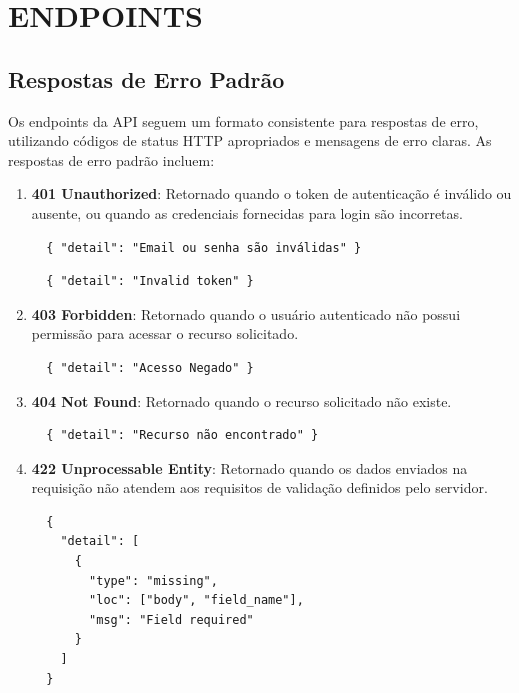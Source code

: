 \chapter{ENDPOINTS}









\section{Respostas de Erro Padrão}

\hspace{0.5cm} Os endpoints da API seguem um formato consistente para respostas de erro, utilizando códigos de status HTTP apropriados e mensagens de erro claras.
As respostas de erro padrão incluem:

\begin{enumerate}
  \item \textbf{401 Unauthorized}: Retornado quando o token de autenticação é inválido ou ausente, ou quando as credenciais fornecidas para login são incorretas.
  \begin{verbatim}
  { "detail": "Email ou senha são inválidas" }
  \end{verbatim}

  \begin{verbatim}
  { "detail": "Invalid token" }
  \end{verbatim}

  \item \textbf{403 Forbidden}: Retornado quando o usuário autenticado não possui permissão para acessar o recurso solicitado.
  \begin{verbatim}
  { "detail": "Acesso Negado" }
  \end{verbatim}

  \item \textbf{404 Not Found}: Retornado quando o recurso solicitado não existe.
  \begin{verbatim}
  { "detail": "Recurso não encontrado" }
  \end{verbatim}

  \item \textbf{422 Unprocessable Entity}: Retornado quando os dados enviados na requisição não atendem aos requisitos de validação definidos pelo servidor.
  \begin{verbatim}
  {
    "detail": [
      {
        "type": "missing",
        "loc": ["body", "field_name"],
        "msg": "Field required"
      }
    ]
  }
  \end{verbatim}
\end{enumerate}

\newpage
